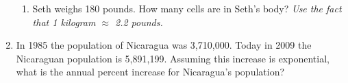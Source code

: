 \documentclass[12pt]{article}
\begin{document}
\begin{enumerate}
\begin{enumerate}
\item Seth weighs 180 pounds. How many cells are in Seth's body?  \emph{Use the fact that 1 kilogram $\approx$ 2.2 pounds.}
\vfill



\end{enumerate}


\item In 1985 the population of Nicaragua was 3,710,000.  Today in 2009 the Nicaraguan population is 5,891,199.  Assuming this increase is exponential, what is the annual percent increase for Nicaragua's population?
\vfill

\end{enumerate}
\end{document}

